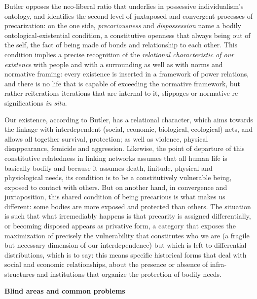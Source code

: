 \documentclass[a4paper,]{scrartcl}
\begin{document}
Butler opposes the neo-liberal ratio that underlies in possessive
individualism's ontology, and identifies the second level of juxtaposed
and convergent processes of precarization: on the one side,
\emph{precariousness} and \emph{dispossession} name a bodily
ontological-existential condition, a constitutive openness that always
being out of the self, the fact of being made of bonds and relationship
to each other. This condition implies a precise recognition of the
\emph{relational characteristic of our existence} with people and with a
surrounding as well as with norms and normative framing: every existence
is inserted in a framework of power relations, and there is no life that
is capable of exceeding the normative framework, but rather
reiterations-iterations that are internal to it, slippages or normative
re-significations \emph{in situ}.

Our existence, according to Butler, has a relational character, which
aims towards the linkage with interdependent (social, economic,
biological, ecological) nets, and allows all together survival,
protection; as well as violence, physical disappearance, femicide and
aggression. Likewise, the point of departure of this constitutive
relatedness in linking networks assumes that all human life is basically
bodily and because it assumes death, finitude, physical and
physiological needs, its condition is to be a constitutively vulnerable
being, exposed to contact with others. But on another hand, in
convergence and juxtaposition, this shared condition of being precarious
is what makes us different: some bodies are more exposed and protected
than others. The situation is such that what irremediably happens is
that precarity is assigned differentially, or becoming disposed appears
as privative form, a category that exposes the maximization of precisely
the vulnerability that constitutes who we are (a fragile but necessary
dimension of our interdependence) but which is left to differential
distributions, which is to say: this means specific historical forms
that deal with social and economic relationships, about the presence or
absence of infra-structures and institutions that organize the
protection of bodily needs.

\textbf{Blind areas and common problems}
\end{document}
